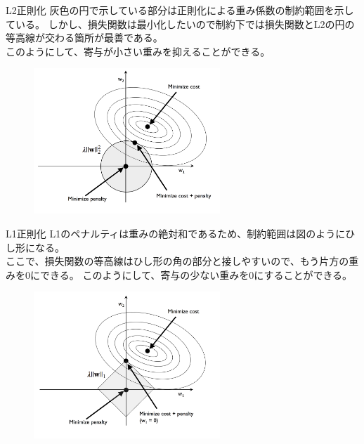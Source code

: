 \documentclass[aspectratio=169, dvipdfmx, 11pt]{beamer} %
\begin{document}
\begin{frame}{L2正則化}
    灰色の円で示している部分は正則化による重み係数の制約範囲を示している。
    しかし、損失関数は最小化したいので制約下では損失関数とL2の円の等高線が交わる箇所が最善である。\\
    このようにして、寄与が小さい重みを抑えることができる。
    \begin{figure}[b]
        \begin{center}
        \includegraphics[width=70mm]{img/day04/fig02.png}
        \end{center}
    \end{figure}
\end{frame}

\begin{frame}{L1正則化}
    L1のペナルティは重みの絶対和であるため、制約範囲は図のようにひし形になる。\\
    ここで、損失関数の等高線はひし形の角の部分と接しやすいので、もう片方の重みを0にできる。
    このようにして、寄与の少ない重みを0にすることができる。
    \begin{figure}[b]
        \begin{center}
        \includegraphics[width=70mm]{img/day04/fig03.png}
        \end{center}
    \end{figure}
\end{frame}
\end{document}
